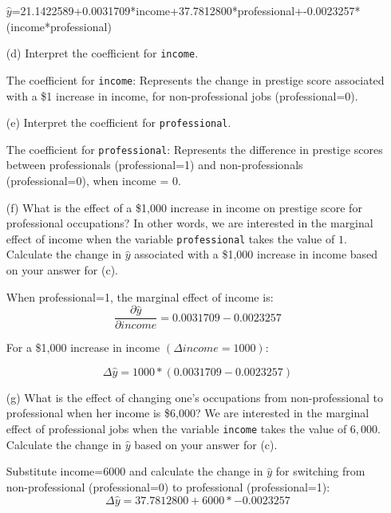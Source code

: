 \documentclass[12pt,letterpaper]{article}
\begin{document}
\begin{enumerate}
$\hat{y}$=21.1422589+0.0031709*income+37.7812800*professional+-0.0023257*(income*professional) 
\newpage
	\item [(d)]
	Interpret the coefficient for \texttt{income}.
	
	  The coefficient for \texttt{income}: Represents the change in prestige score associated with a \$1 increase in income, for non-professional jobs (professional=0).
	\vspace{10cm}	
	\item [(e)]
	Interpret the coefficient for \texttt{professional}.
	
	The coefficient for \texttt{professional}: Represents the difference in prestige scores between professionals (professional=1) and non-professionals (professional=0), when income = 0.
	\newpage
	\item [(f)]
	What is the effect of a \$1,000 increase in income on prestige score for professional occupations? In other words, we are interested in the marginal effect of income when the variable \texttt{professional} takes the value of $1$. Calculate the change in $\hat{y}$ associated with a \$1,000 increase in income based on your answer for (c).
	
	When professional=1, the marginal effect of income is: \\
	
$$ \frac{\partial \hat{y}}{\partial income} = 0.0031709-0.0023257$$
 
 For a \$1,000 increase in income $(\Delta income = 1000): $
 
$$ \Delta \hat{y}=1000*(0.0031709-0.0023257)$$
 
	\vspace{6cm}
	
	
	\item [(g)]
	What is the effect of changing one's occupations from non-professional to professional when her income is \$6,000? We are interested in the marginal effect of professional jobs when the variable \texttt{income} takes the value of $6,000$. Calculate the change in $\hat{y}$ based on your answer for (c).
	
	Substitute income=6000 and calculate the change in $\hat{y}$ for switching from non-professional (professional=0) to professional (professional=1):\\

$$	\Delta \hat{y}=37.7812800+6000*-0.0023257$$
	
\end{enumerate}
\end{document}
